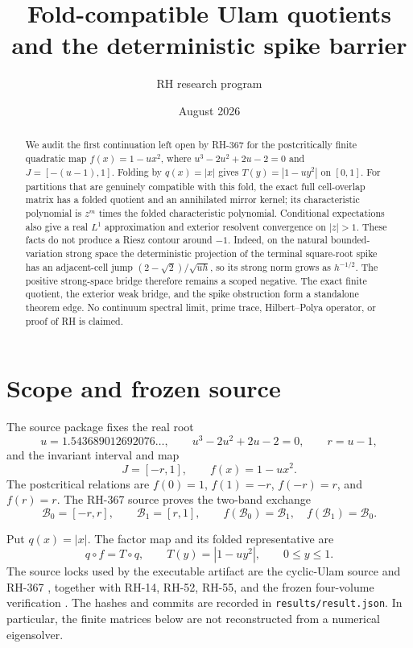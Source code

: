 \documentclass[11pt]{article}
\title{Fold-compatible Ulam quotients and the deterministic spike barrier}
\author{RH research program}
\date{August 2026}
\newcommand{\J}{J}
\begin{document}
\maketitle

\begin{abstract}
We audit the first continuation left open by RH-367 for the postcritically
finite quadratic map $f(x)=1-u x^2$, where
$u^3-2u^2+2u-2=0$ and $\J=[-(u-1),1]$.  Folding by $q(x)=|x|$ gives
$T(y)=|1-u y^2|$ on $[0,1]$.  For partitions that are genuinely compatible
with this fold, the exact full cell-overlap matrix has a folded quotient and
an annihilated mirror kernel; its characteristic polynomial is
$z^m$ times the folded characteristic polynomial.  Conditional expectations
also give a real $L^1$ approximation and exterior resolvent convergence on
$|z|>1$.  These facts do not produce a Riesz contour around $-1$.
Indeed, on the natural bounded-variation strong space the deterministic
projection of the terminal square-root spike has an adjacent-cell jump
$(2-\sqrt2)/\sqrt{u h}$, so its strong norm grows as $h^{-1/2}$.  The
positive strong-space bridge therefore remains a scoped negative.  The exact
finite quotient, the exterior weak bridge, and the spike obstruction form a
standalone theorem edge.  No continuum spectral limit, prime trace,
Hilbert--Polya operator, or proof of RH is claimed.
\end{abstract}

\section{Scope and frozen source}

The source package fixes the real root
\begin{equation}
 u=1.543689012692076\ldots,\qquad u^3-2u^2+2u-2=0,
 \qquad r=u-1,
\end{equation}
and the invariant interval and map
\begin{equation}
 \J=[-r,1],\qquad f(x)=1-u x^2.
 \label{eq:map}
\end{equation}
The postcritical relations are
$f(0)=1$, $f(1)=-r$, $f(-r)=r$, and $f(r)=r$.
The RH-367 source proves the two-band exchange
\begin{equation}
 \mathcal B_0=[-r,r],\qquad \mathcal B_1=[r,1],
 \qquad f(\mathcal B_0)=\mathcal B_1,\quad f(\mathcal B_1)=\mathcal B_0.
 \label{eq:bands}
\end{equation}

Put $q(x)=|x|$.  The factor map and its folded representative are
\begin{equation}
 q\circ f=T\circ q,\qquad T(y)=|1-u y^2|,\qquad 0\leq y\leq1.
 \label{eq:fold}
\end{equation}
The source locks used by the executable artifact are the cyclic-Ulam source
and RH-367 \cite{cycliculam2026,rh3672026}, together with RH-14, RH-52,
RH-55, and the frozen four-volume verification \cite{rh14,rh52,rh55}.
The
hashes and commits are recorded in \texttt{results/result.json}.  In
particular, the finite matrices below are not reconstructed from a numerical
eigensolver.
\end{document}
